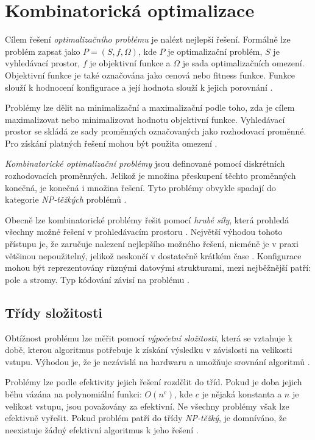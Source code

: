 \chapter{Kombinatorická optimalizace}
Cílem řešení \textit{optimalizačního problému} je nalézt nejlepší řešení.
Formálně lze problém zapsat jako $P=(S, f, \Omega)$, kde $P$ je optimalizační problém, $S$ je vyhledávací prostor, $f$ je objektivní funkce a $\Omega$ je sada optimalizačních omezení.
Objektivní funkce je také označována jako cenová nebo fitness funkce.
Funkce slouží k hodnocení konfigurace a její hodnota slouží k jejich porovnání \cite{peres}.

Problémy lze dělit na minimalizační a maximalizační podle toho, zda je cílem maximalizovat nebo minimalizovat hodnotu objektivní funkce.
Vyhledávací prostor se skládá ze sady proměnných označovaných jako rozhodovací proměnné.
Pro získání platných řešení mohou být použita omezení \cite{kirkpatrik, peres}.

\textit{Kombinatorické optimalizační problémy} jsou definované pomocí diskrétních rozhodovacích proměnných.
Jelikož je množina přeskupení těchto proměnných konečná, je konečná i množina řešení.
Tyto problémy obvykle spadají do kategorie \textit{NP-těžkých} problémů \cite{peres}.

Obecně lze  kombinatorické problémy řešit pomocí \textit{hrubé síly}, která prohledá všechny možné řešení v prohledávacím prostoru \cite{peres}.
Největší výhodou tohoto přístupu je, že zaručuje nalezení nejlepšího možného řešení, nicméně je v praxi většinou nepoužitelný, jelikož neskončí v dostatečně krátkém čase \cite{efficient-backtesting}.
Konfigurace mohou být reprezentovány různými datovými strukturami, mezi nejběžnější patří: pole a stromy.
Typ kódování závisí na problému \cite{peres}.

\section{Třídy složitosti}
Obtížnost problému lze měřit pomocí \textit{výpočetní složitosti}, která se vztahuje k době, kterou algoritmus potřebuje k získání výsledku v závislosti na velikosti vstupu.
Výhodou je, že je nezávislá na hardwaru a umožňuje srovnání algoritmů \cite{peres}.

Problémy lze podle efektivity jejich řešení rozdělit do tříd.
Pokud je doba jejich běhu vázána na polynomiální funkci: $O(n^c)$, kde $c$ je nějaká konstanta a $n$ je velikost vstupu, jsou považovány za efektivní.
Ne všechny problémy však lze efektivně vyřešit.
Pokud problém patří do třídy \textit{NP-těžký}, je domníváno, že neexistuje žádný efektivní algoritmus k jeho řešení \cite{erickson}.

